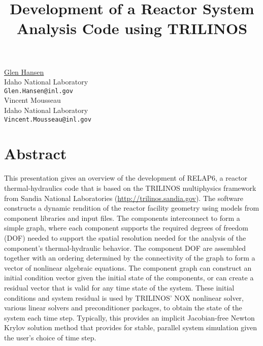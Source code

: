 


\title{Development of a Reactor System Analysis Code using TRILINOS}
\author{} \institute{} %
\maketitle
\begin{center}
{\large \underline{Glen Hansen}}\\
Idaho National Laboratory\\
{\tt Glen.Hansen@inl.gov}\\
\vspace{4mm} %
{\large Vincent Mousseau}\\
Idaho National Laboratory\\
{\tt Vincent.Mousseau@inl.gov}
\end{center}

\section*{Abstract}

This presentation gives an overview of the development of RELAP6, a reactor
thermal-hydraulics code that is based on the TRILINOS multiphysics framework
from Sandia National Laboratories (\url{http://trilinos.sandia.gov}). The
software constructs a dynamic rendition of the reactor facility geometry using
models from component libraries and input files. The components interconnect to
form a simple graph, where each component supports the required degrees of
freedom (DOF) needed to support the spatial resolution needed for the analysis
of the component's thermal-hydraulic behavior. The component DOF are assembled
together with an ordering determined by the connectivity of the graph to form a
vector of nonlinear algebraic equations.  The component graph can construct an
initial condition vector given the initial state of the components, or can
create a residual vector that is valid for any time state of the system. These initial
conditions and system residual is used by TRILINOS' NOX nonlinear solver, various linear solvers
and preconditioner packages, to obtain the state of the system each time step. Typically, this
provides an implicit Jacobian-free Newton Krylov solution method that provides for stable, parallel
system simulation given the user's choice of time step.

